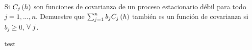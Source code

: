 \documentclass[../main.tex]{subfiles}
\begin{document}
    \begin{enunciado}
    	Si $C_j\left( h \right)$ son funciones de covarianza de un proceso estacionario débil para todo $j = 1,...,n$. Demuestre que $\sum_{j = 1}^{n} b_j C_j\left( h \right)$ también es un función de covarianza si $b_j \geq 0$, $\forall\  j$.
    \end{enunciado}
    
    \begin{demostracion}
        test
    \end{demostracion}
\end{document}

